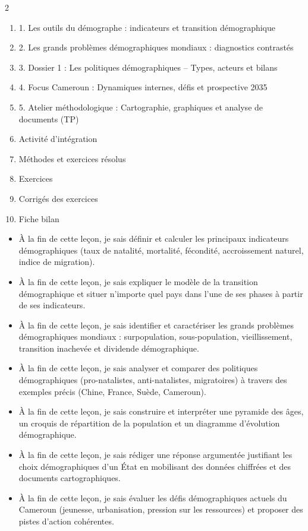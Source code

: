\documentclass[11pt]{article}
\begin{document}
\begin{sommaire}
\begin{multicols}{2}
\begin{enumerate}
\item 1. Les outils du démographe : indicateurs et transition démographique
\item 2. Les grands problèmes démographiques mondiaux : diagnostics contrastés
\item 3. Dossier 1 : Les politiques démographiques – Types, acteurs et bilans
\item 4. Focus Cameroun : Dynamiques internes, défis et prospective 2035
\item 5. Atelier méthodologique : Cartographie, graphiques et analyse de documents (TP)
\item Activité d'intégration
\item Méthodes et exercices résolus
\item Exercices
\item Corrigés des exercices
\item Fiche bilan
\end{enumerate}
\end{multicols}
\end{sommaire}

\begin{objectifs}
\begin{itemize}
\item À la fin de cette leçon, je sais définir et calculer les principaux indicateurs démographiques (taux de natalité, mortalité, fécondité, accroissement naturel, indice de migration).
\item À la fin de cette leçon, je sais expliquer le modèle de la transition démographique et situer n'importe quel pays dans l'une de ses phases à partir de ses indicateurs.
\item À la fin de cette leçon, je sais identifier et caractériser les grands problèmes démographiques mondiaux : surpopulation, sous-population, vieillissement, transition inachevée et dividende démographique.
\item À la fin de cette leçon, je sais analyser et comparer des politiques démographiques (pro-natalistes, anti-natalistes, migratoires) à travers des exemples précis (Chine, France, Suède, Cameroun).
\item À la fin de cette leçon, je sais construire et interpréter une pyramide des âges, un croquis de répartition de la population et un diagramme d'évolution démographique.
\item À la fin de cette leçon, je sais rédiger une réponse argumentée justifiant les choix démographiques d'un État en mobilisant des données chiffrées et des documents cartographiques.
\item À la fin de cette leçon, je sais évaluer les défis démographiques actuels du Cameroun (jeunesse, urbanisation, pression sur les ressources) et proposer des pistes d'action cohérentes.
\end{itemize}
\end{objectifs}
\end{document}
